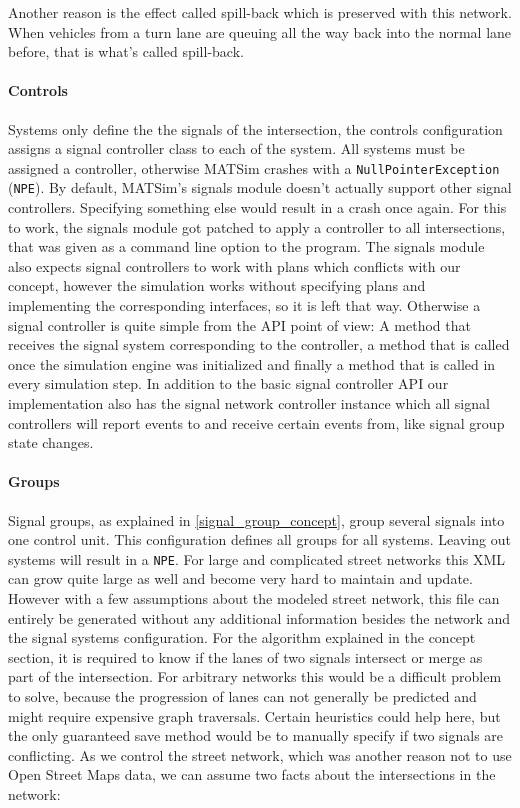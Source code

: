 Another reason is the effect called spill-back which is preserved with this network. When vehicles from a turn lane are queuing all the way back into the normal lane before, that is what's called spill-back. \cite{matsim}

\paragraph{Controls} Systems only define the the signals of the intersection, the controls configuration assigns a signal controller class to each of the system. All systems must be assigned a controller, otherwise MATSim crashes with a \texttt{NullPointerException} (\texttt{NPE}). By default, MATSim's signals module doesn't actually support other signal controllers. Specifying something else would result in a crash once again. For this to work, the signals module got patched to apply a controller to all intersections, that was given as a command line option to the program. The signals module also expects signal controllers to work with plans which conflicts with our concept, however the simulation works without specifying plans and implementing the corresponding interfaces, so it is left that way. Otherwise a signal controller is quite simple from the API point of view: A method that receives the signal system corresponding to the controller, a method that is called once the simulation engine was initialized and finally a method that is called in every simulation step. In addition to the basic signal controller API our implementation also has the signal network controller instance which all signal controllers will report events to and receive certain events from, like signal group state changes.

\paragraph{Groups} Signal groups, as explained in \autoref{signal_group_concept}, group several signals into one control unit. This configuration defines all groups for all systems. Leaving out systems will result in a \texttt{NPE}. For large and complicated street networks this XML can grow quite large as well and become very hard to maintain and update. However with a few assumptions about the modeled street network, this file can entirely be generated without any additional information besides the network and the signal systems configuration. For the algorithm explained in the concept section, it is required to know if the lanes of two signals intersect or merge as part of the intersection. For arbitrary networks this would be a difficult problem to solve, because the progression of lanes can not generally be predicted and might require expensive graph traversals. Certain heuristics could help here, but the only guaranteed save method would be to manually specify if two signals are conflicting. As we control the street network, which was another reason not to use Open Street Maps data, we can assume two facts about the intersections in the network:

